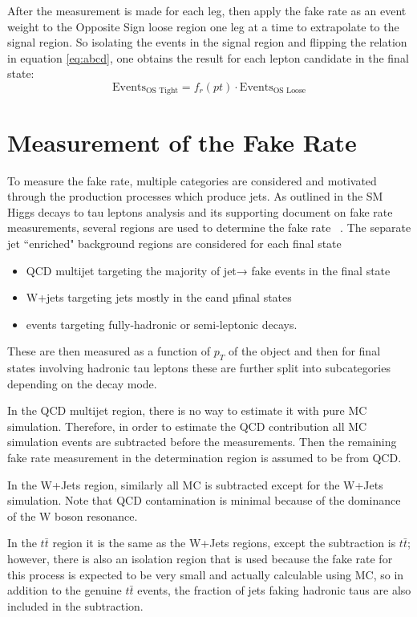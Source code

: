 After the measurement is made for each leg, then apply the fake rate as an event weight to the Opposite Sign loose region one leg at a time to extrapolate to the signal region. So isolating the events in the signal region and flipping the relation in equation \ref{eq:abcd}, one obtains the result for each lepton candidate in the final state: 
\begin{equation}
\text{Events}_\text{OS Tight} = f_r(pt)\cdot \text{Events}_\text{OS Loose}  
\end{equation}

\section{Measurement of the Fake Rate}
To measure the fake rate, multiple categories are considered and motivated through the production processes which produce jets. As outlined in the SM Higgs decays to tau leptons analysis and its supporting document on fake rate measurements, several regions are used to determine the fake rate ~\cite{AN16355}. The separate jet ``enriched" background regions are considered for each final state
\begin{itemize}
	\item QCD multijet targeting the majority of jet→ \tauh fake events in the \tauh \tauh final state
	\item W+jets targeting jets mostly in the e\tauh and µ\tauh final states
	\item \ttbar events targeting fully-hadronic or semi-leptonic decays.
\end{itemize} 



These are then measured as a function of $p_T$ of the object and then for final states involving hadronic tau leptons these are further split into subcategories depending on the decay mode.  

In the QCD multijet region, there is no way to estimate it with pure MC simulation. Therefore, in order to estimate the QCD contribution all MC simulation events are subtracted before the measurements. Then the remaining fake rate measurement in the determination region is assumed to be from QCD.

In the W+Jets region, similarly all MC is subtracted except for the W+Jets simulation. Note that QCD contamination is minimal because of the dominance of the W boson resonance. 

In the $t\bar{t}$ region it is the same as the W+Jets regions, except the subtraction is $t\bar{t}$; however, there is also an isolation region that is used because the fake rate for this process is expected to be very small and actually calculable using MC, so in addition to the genuine $t\bar{t}$ events, the fraction of jets faking hadronic taus are also included in the subtraction. 



